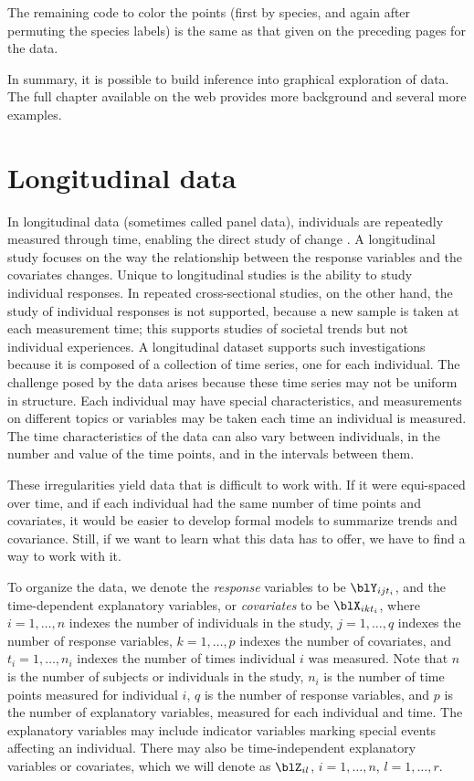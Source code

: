 \noindent The remaining code to color the points (first by species,
and again after permuting the species labels) is the same as that
given on the preceding pages for the  data.

In summary, it is possible to build inference into graphical
exploration of data. The full chapter available on the web provides
more background and several more examples.

\section{Longitudinal data}


In longitudinal data (sometimes called panel data), individuals are
repeatedly measured through time, enabling the direct study of change
\cite{DHLZ02}.  A longitudinal study focuses on the way the
relationship between the response variables and the covariates
changes.  Unique to longitudinal studies is the ability to study
individual responses.  In repeated cross-sectional studies, on the
other hand, the study of individual responses is not supported,
because a new sample is taken at each measurement time; this supports
studies of societal trends but not individual experiences.  A
longitudinal dataset supports such investigations because it is
composed of a collection of time series, one for each individual.  The
challenge posed by the data arises because these time series may not
be uniform in structure.  Each individual may have special
characteristics, and measurements on different topics or variables may
be taken each time an individual is measured.  The time
characteristics of the data can also vary between individuals, in the
number and value of the time points, and in the intervals between
them.

These irregularities yield data that is difficult to work with.  If it
were equi-spaced over time, and if each individual had the same number
of time points and covariates, it would be easier to develop formal
models to summarize trends and covariance.  Still, if we want to learn
what this data has to offer, we have to find a way to work with it.

To organize the data, we denote the {\em response} variables to be
$\blY_{ijt_i}$, and the time-dependent explanatory variables, or {\em
covariates} to be $\blX_{ikt_i}$, where $i=1,\dots , n$ indexes the
number of individuals in the study, $j=1, \dots ,q$ indexes the number
of response variables, $k=1, \dots ,p$ indexes the number of
covariates, and $t_i=1, \dots , n_i$ indexes the number of times
individual $i$ was measured.  Note that $n$ is the number of subjects
or individuals in the study, $n_i$ is the number of time points
measured for individual $i$, $q$ is the number of response variables,
and $p$ is the number of explanatory variables, measured for each
individual and time. The explanatory variables may include indicator
variables marking special events affecting an individual. There may
also be time-independent explanatory variables or covariates, which we
will denote as $\blZ_{il}$, $i=1,\dots ,n$, $l=1, \dots ,
r$. 

